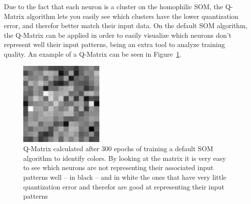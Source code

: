 Due to the fact that each neuron is a cluster on the homophilic \ac{SOM}, the Q-Matrix algorithm lets you easily see which clusters have the lower quantization error, and therefor better match their input data. On the default \ac{SOM} algorithm, the Q-Matrix can be applied in order to easily visualize which neurons don't represent well their input patterns, being an extra tool to analyze training quality. An example of a Q-Matrix can be seen in Figure~\ref{fig:som_trqmatrix}.
\begin{figure}[htpb]
  \centering
  \includegraphics[scale=2]{./images/som_training/2_quantmatrix.pdf}
  \caption{Q-Matrix calculated after 300 epochs of training a default \ac{SOM} algorithm to identify colors. By looking at the matrix it is very easy to see which neurons are not representing their associated input patterns well -- in black -- and in white the ones that have very little quantization error and therefor are good at representing their input patterns}
  \label{fig:som_trqmatrix}
\end{figure}

